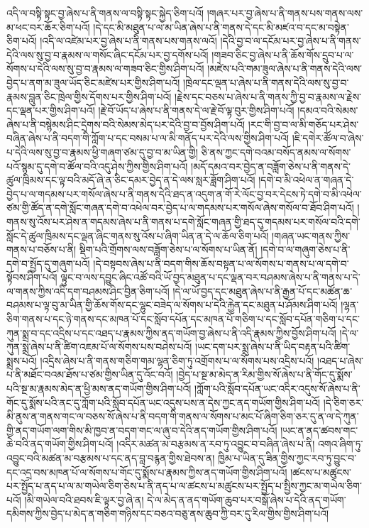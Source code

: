 འདི་ལ་བསྟི་སྟང་བྱ་ཞེས་པ་ནི་གནས་ལ་བསྟི་སྟང་སྐྱེད་ཅིག་པའོ། །གཞར་པར་བྱ་ཞེས་པ་ནི་གནས་པས་གནས་ལས་མ་ཕང་བར་ཆོར་ཅིག་པའོ། །དེ་དང་མི་མཐུན་པ་ལ་མ་ཡིན་ཞེས་པ་ནི་གནས་དེ་དང་མི་མཛའ་བ་དང་མ་བསྟེན་ཅིག་པའོ། །འདི་ལ་འཛེམ་པར་བྱ་ཞེས་པ་ནི་གནས་པས་གནས་ལའོ། །དེའི་བྱ་བ་ལ་དངོམ་པར་བྱ་ཞེས་པ་ནི་གནས་དེའི་ལས་སུ་བྱ་བ་རྣམས་ལ་གསོང་ཞིང་དངོམ་པར་བྱ་དགོས་པའོ། །གཟབ་ཅིང་བྱ་ཞེས་པ་ནི་ཆོས་གོས་དྲུབ་པ་ལ་སོགས་པ་དེའི་ལས་སུ་བྱ་བ་རྣམས་ལ་གཟབ་ཅིང་གྱིས་ཤིག་པའོ། །མཛེས་པའི་གམ་ཟུལ་ཞེས་པ་ནི་གནས་དེའི་ལས་བྱེད་པ་ནག་མ་ཟུལ་ཡོད་ཅིང་མཛེས་པར་གྱིས་ཤིག་པའོ། །ཁྲེལ་དང་ལྡན་པ་ཞེས་པ་ནི་གནས་དེའི་ལས་སུ་བྱ་བ་རྣམས་བླུན་ཅིང་ཁྲེལ་གྱིས་དོགས་པར་གྱིས་ཤིག་པའོ། །རྗེས་དང་བཅས་པ་ཞེས་པ་ནི་གནས་ཀྱི་བྱ་བ་རྣམས་ལ་རྗེས་དང་ལྡན་པར་གྱིས་ཤིག་པའོ། །རྗེ་བོ་ཡོད་པ་ཞེས་པ་ནི་གནས་དེ་ལ་རྗེ་བོ་ལྟ་བུར་གྱིས་ཤིག་པའོ། །དམའ་བའི་སེམས་ཞེས་པ་ནི་བསྙེམས་ཤིང་དྲེགས་བའི་སེམས་མེད་པར་དེའི་བྱ་བ་བྱོས་ཤིག་པའོ། །རང་གི་བྱ་བ་ལ་མི་གཅོད་པར་ཤེས་བཞིན་ཞེས་པ་ནི་བདག་གི་ཀློག་པ་དང་བསམ་པ་ལ་མི་གནོད་པར་དེའི་ལས་གྱིས་ཤིག་པའོ། །ཇི་དགེར་ཚོལ་བ་ཞེས་པ་དེའི་ལས་སུ་བྱ་བ་རྣམས་ཕྱི་གཞག་ཙམ་དུ་བྱ་བ་མ་ཡིན་གྱི། ཅི་ནས་ཀྱང་དགེ་བའམ་བསོད་ནམས་ལ་སོགས་པའོ་སྙམ་དུ་དགེ་བ་ཚོལ་བའི་འདུ་ཤེས་ཀྱིས་གྱིས་ཤིག་པའོ། །མདོ་དམའ་བར་བྱེད་ན་བཟློག་ཅེས་པ་ནི་གནས་དེ་ཚུལ་ཁྲིམས་དང་ལྟ་བའི་མདོ་ཞེ་ན་ཅིང་དམར་བྱེད་ན་དེ་ལས་སླར་ཟློག་ཤིག་པའོ། །དགེ་བ་མི་འཕེལ་ན་གཞན་དེ་བྱེད་པ་ལ་གདམས་པར་གསོལ་ཞེས་པ་ནི་གནས་དེའི་ཐད་ན་འདུག་ན་གོ་རེ་ལོང་བྱ་བར་དེངས་ཏེ་དགེ་བ་མི་འཕེལ་ཙམ་གྱི་ཚོད་ན་དགེ་སློང་གཞན་དགེ་བ་འཕེལ་བར་བྱེད་པ་ལ་གདམས་པར་གསོལ་ཞེས་གསོལ་བ་ཐོབ་ཤིག་པའོ། །གནས་སུ་འོས་པར་ཤེས་ན་གདམས་ཞེས་པ་ནི་གནས་པ་དགེ་སློང་གཞན་གྱི་ཐད་དུ་གདམས་པར་གསོལ་བའི་དགེ་སློང་དེ་ཚུལ་ཁྲིམས་དང་ལྡན་ཞིང་གནས་སུ་འོས་པ་ཞིག་ཡིན་ན་དེ་ལ་ཆོལ་ཅིག་པའོ། །གཞན་ཡང་གནས་ཀྱིས་གནས་པ་བཅོས་པ་ནི། སྡིག་པའི་གྲོགས་ལས་བཟློག་ཅེས་པ་ལ་སོགས་པ་ཡིན་ནོ། །དགེ་བ་ལ་གཞུག་ཅེས་པ་ནི་དགེ་བ་སྤྱོད་དུ་གཞུག་པའོ། །དེ་བསྟབས་ཞེས་པ་ནི་བདག་གིས་ཆོས་བསྟན་པ་ལ་སོགས་པ་གནས་པ་ལ་དགེ་བ་སྟོབས་ཤིག་པའོ། ལྟུང་བ་ལས་དབྱུང་ཞིང་འཚོ་བའི་ཡོ་བྱད་མཐུན་པ་དང་ལྡན་བར་བཤམས་ཞེས་པ་ནི་གནས་པ་དེ་ལ་གནས་ཀྱིས་འདི་དག་བཤམས་ཤིང་བྱིན་ཅིག་པའོ། །དེ་ལ་ཡོ་བྱད་དང་མཐུན་ཞེས་པ་ནི་རྒྱན་པོ་དང་མཚོན་ཆ་བཤམས་པ་ལྟ་བུ་མ་ཡིན་གྱི་ཆོས་གོས་དང་ལྷུང་བཟེད་ལ་སོགས་པ་དེའི་རྐྱེན་དང་མཐུན་པ་ཤོམས་ཤིག་པའོ། །ལྷན་ཅིག་གནས་པ་དང་ཉེ་གནས་དང་མཁན་པོ་དང་སློབ་དཔོན་དང་མཁན་པོ་གཅིག་པ་དང་སློབ་དཔོན་གཅིག་པ་དང་ཀུན་སྨྲ་བ་དང་འདྲིས་པ་དང་འཐད་པ་རྣམས་ཀྱིས་ནད་གཡོག་བྱ་ཞེས་པ་ནི་འདི་རྣམས་ཀྱིས་བྱོས་ཤིག་པའོ། །དེ་ལ་ཀུན་སྨྲ་ཞེས་པ་ནི་ཚིག་འཇམ་པོ་ལ་སོགས་པས་བཤེས་པའོ། །ཡང་དག་པར་སྨྲ་ཞེས་པ་ནི་ཡིད་བརྟན་པའི་ཚིག་སྨྲས་པའོ། །འདྲིས་ཞེས་པ་ནི་གནས་གཅིག་གམ་ལྷན་ཅིག་ཏུ་འགྲོགས་པ་ལ་སོགས་པས་འདྲིས་པའོ། །འཐད་པ་ཞེས་པ་ནི་མཐོང་བའམ་ཐོས་པ་ཙམ་གྱིས་ཡིན་དུ་འོང་བའོ། །བྱེད་པ་སྔ་མ་མེད་ན་རིམ་གྱིས་སོ་ཞེས་པ་ནི་གོང་དུ་སྨོས་པའི་སྔ་མ་རྣམས་མེད་ན་ཕྱི་མས་ནད་གཡོག་གྱིས་ཤིག་པའོ། །ཀློག་པའི་སློབ་དཔོན་ཡང་འདིར་འདུས་སོ་ཞེས་པ་ནི་གོང་དུ་སྨོས་པའི་ནང་དུ་ཀློག་པའི་སློབ་དཔོན་ཡང་འདུས་པས་ན་དེས་ཀྱང་ནད་གཡོག་གྱིས་ཤིག་པའོ། །དེ་ཅིག་ཅར་མི་ནུས་ན་གནས་གང་ལ་བཅས་སོ་ཞེས་པ་ནི་བདག་གི་གནས་ལ་སོགས་པ་མང་པོ་ཞིག་ཅིག་ཅར་དུ་ན་ལ་དེ་ཀུན་གྱི་ནད་གཡོག་ལག་གིས་མི་ཁྱབ་ན་བདག་གང་ལ་ཞུ་བ་དེའི་ནད་གཡོག་གྱིས་ཤིག་པའོ། །ཡང་ན་ནད་ཚབས་གང་ཆེ་བའི་ནད་གཡོག་གྱིས་ཤིག་པའོ། །འདིར་མཚན་མ་བརྩམས་ན་རབ་ཏུ་འབྱུང་བ་བཞིན་ཞེས་པ་ནི། འགའ་ཞིག་ཏུ་འབྱུང་བའི་མཚན་མ་བརྩམས་པ་དང་ནད་བླ་བརྙན་གྱིས་ཐེབས་ན། ཁྱིམ་པ་ཡིན་དུ་ཟིན་གྱིས་ཀྱང་རབ་ཏུ་བྱུང་བ་དང་འདྲ་བས་མཁན་པོ་ལ་སོགས་པ་གོང་དུ་སྨོས་པ་རྣམས་ཀྱིས་ནད་གཡོག་གྱིས་ཤིག་པའོ། །ཚངས་པ་མཚུངས་པར་སྤྱོད་པ་ནད་པ་ལ་མ་གཡེལ་ཅིག་ཅེས་པ་ནི་ནད་པ་ལ་ཚངས་པ་མཚུངས་པར་སྤྱོད་པ་སྤྱིས་ཀྱང་མ་གཡེལ་ཅིག་པའོ། །མི་གཡེལ་བའི་ཐབས་ཇི་ལྟར་བྱ་ཞེ་ན། དེ་ལ་མེད་ན་ནད་གཡོག་ཆུབ་པར་བསྒོ་ཞེས་པ་དེའི་ནད་གཡོག་དམིགས་ཀྱིས་བྱེད་པ་མེད་ན་གཅིག་གཉིས་དང་བཅའ་བཅུ་ནས་ཆུབ་ཀྱི་བར་དུ་རིལ་གྱིས་གྱིས་ཤིག་པའོ། 